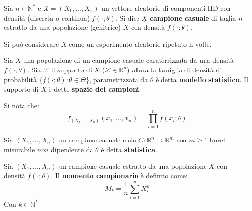 \begin{definition}
Sia $n\in\mathbb{N}^*$ e $\underline{X}=(X_1,...,X_n)$ un vettore aleatorio di componenti IID con densità (discreta o continua) $f(\cdot;\theta)$. Si dice $\underline{X}$ \textbf{campione casuale} di taglia $n$ estratto da una popolazione (genitrice) $X$ con densità $f(\cdot;\theta)$.
\end{definition}

\vspace{10px}

Si può considerare $\underline{X}$ come un esperimento aleatorio ripetuto n volte.

\vspace{10px}

\begin{definition}
Sia $X$ una popolazione di un campione casuale caraterrizzata da una densità $f(\cdot,\theta)$. Sia $\mathcal{X}$ il supporto di $X$ ($\mathcal{X}\in\mathbb{R}^n$) allora la famiglia di densità di probabilità $\{f(\cdot;\theta) : \theta\in\Theta\}$, parametrizzata da $\theta$ è detta \textbf{modello statistico}.
\newline
Il supporto di $\underline{X}$ è detto \textbf{spazio dei campioni}.
\end{definition} 

\vspace{5px}

\begin{observation}
Si nota che:\[f_{(X_1,...,X_n)}(x_1,...,x_n)=\prod\limits_{i=1}^nf(x_i;\theta)\]
\end{observation}

\vspace{15px}

\begin{definition}
Sia $(X_1,...,X_n)$ un campione casuale e sia $G:\mathbb{R}^n\longrightarrow\mathbb{R}^m$ con $m\geq 1$ borel-misurabile $non$ dipendente da $\theta$ è detta \textbf{statistica}.
\end{definition}

\vspace{10px}

\begin{definition}
Sia $(X_1,...,X_n)$ un campione casuale estratto da una popolazione $X$ con densità $f(\cdot;\theta)$. Il \textbf{momento campionario} è definito come:
\[M_k=\frac{1}{n}\sum_{i=1}^nX_i^k\]
Con $k\in\mathbb{N}^*$
\end{definition}

\vspace{15px}

